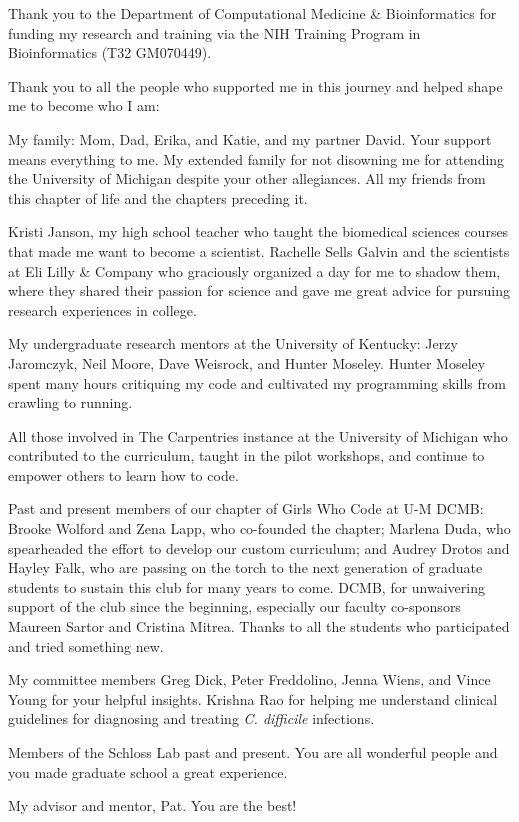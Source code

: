 Thank you to the Department of Computational Medicine \& Bioinformatics for
funding my research and training via the NIH Training Program in Bioinformatics
(T32 GM070449).

Thank you to all the people who supported me in this journey and helped shape me
to become who I am:

My family: Mom, Dad, Erika, and Katie, and my partner David.
Your support means everything to me.
My extended family for not disowning me for attending the University of Michigan
despite your other allegiances.
All my friends from this chapter of life and the chapters preceding it.

Kristi Janson, my high school teacher who taught the biomedical sciences
courses that made me want to become a scientist.
Rachelle Sells Galvin and the scientists at Eli Lilly \& Company
who graciously organized a day for me to shadow them,
where they shared their passion for science and gave me great advice for
pursuing research experiences in college.

My undergraduate research mentors at the University of Kentucky:
Jerzy Jaromczyk, Neil Moore, Dave Weisrock, and Hunter Moseley.
Hunter Moseley spent many hours critiquing my code and cultivated my programming
skills from crawling to running.

All those involved in The Carpentries instance at the University of Michigan who
contributed to the curriculum, taught in the pilot workshops, and continue to
empower others to learn how to code.

Past and present members of our chapter of Girls Who Code at U-M DCMB:
Brooke Wolford and Zena Lapp, who co-founded the chapter;
Marlena Duda, who spearheaded the effort to develop our custom curriculum; and
Audrey Drotos and Hayley Falk, who are passing on the torch to the next
generation of graduate students to sustain this club for many years to come.
DCMB, for unwaivering support of the club since the beginning, especially our
faculty co-sponsors Maureen Sartor and Cristina Mitrea.
Thanks to all the students who participated and tried something new.

My committee members Greg Dick, Peter Freddolino, Jenna Wiens, and Vince Young
for your helpful insights.
Krishna Rao for helping me understand clinical guidelines for diagnosing
and treating \textit{C. difficile} infections.

Members of the Schloss Lab past and present.
You are all wonderful people and you made graduate school a great experience.

My advisor and mentor, Pat. You are the best!
